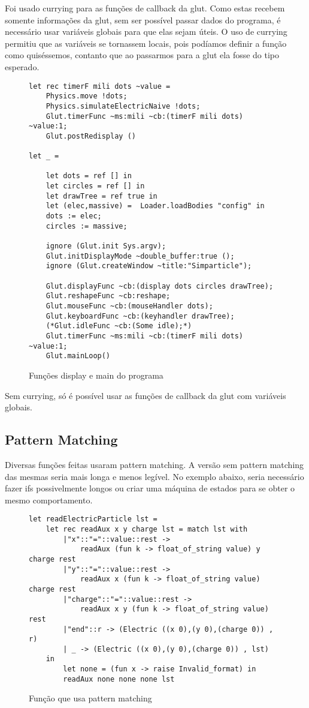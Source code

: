 \documentclass[a4paper,10pt]{article}
\begin{document}
	Foi usado currying para as funções de callback da glut. Como estas recebem somente informações da glut, sem ser possível passar dados do programa, é necessário usar variáveis globais para que elas sejam úteis. O uso de currying permitiu que as variáveis se tornassem locais, pois podíamos definir a função como quiséssemos, contanto que ao passarmos para a glut ela fosse do tipo esperado.
	
	\begin{figure}[H]
	\centering	
	\begin{lstlisting}
let rec timerF mili dots ~value =
	Physics.move !dots;
	Physics.simulateElectricNaive !dots;
	Glut.timerFunc ~ms:mili ~cb:(timerF mili dots) ~value:1;
	Glut.postRedisplay ()
	
let _ =

	let dots = ref [] in
	let circles = ref [] in
	let drawTree = ref true in
	let (elec,massive) =  Loader.loadBodies "config" in
	dots := elec;
	circles := massive;

	ignore (Glut.init Sys.argv);
	Glut.initDisplayMode ~double_buffer:true ();
	ignore (Glut.createWindow ~title:"Simparticle");

	Glut.displayFunc ~cb:(display dots circles drawTree);
	Glut.reshapeFunc ~cb:reshape;
	Glut.mouseFunc ~cb:(mouseHandler dots);
	Glut.keyboardFunc ~cb:(keyhandler drawTree);
	(*Glut.idleFunc ~cb:(Some idle);*)
	Glut.timerFunc ~ms:mili ~cb:(timerF mili dots) ~value:1;
	Glut.mainLoop()
	\end{lstlisting}
	\caption{Funções display e main do programa}
\end{figure}

	Sem currying, só é possível usar as funções de callback da glut com variáveis globais.
	
\subsection{Pattern Matching}

Diversas funções feitas usaram pattern matching. A versão sem pattern matching das mesmas seria mais longa e menos legível. No exemplo abaixo, seria necessário fazer ifs possivelmente longos ou criar uma máquina de estados para se obter o mesmo comportamento.

\begin{figure}[H]
	\centering	
	\begin{lstlisting}
let readElectricParticle lst =
	let rec readAux x y charge lst = match lst with
		|"x"::"="::value::rest ->
			readAux (fun k -> float_of_string value) y charge rest
		|"y"::"="::value::rest ->
			readAux x (fun k -> float_of_string value) charge rest
		|"charge"::"="::value::rest ->
			readAux x y (fun k -> float_of_string value) rest
		|"end"::r -> (Electric ((x 0),(y 0),(charge 0)) , r)
		| _ -> (Electric ((x 0),(y 0),(charge 0)) , lst)
	in
		let none = (fun x -> raise Invalid_format) in
		readAux none none none lst
	\end{lstlisting}
	\caption{Função que usa pattern matching}
\end{figure}
\end{document}
